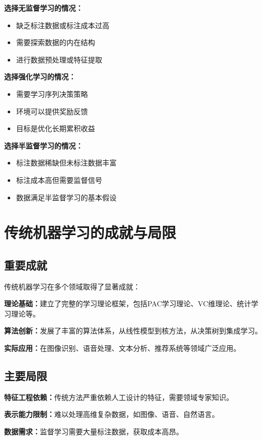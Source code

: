 \textbf{选择无监督学习的情况：}
\begin{itemize}
\item 缺乏标注数据或标注成本过高
\item 需要探索数据的内在结构
\item 进行数据预处理或特征提取
\end{itemize}

\textbf{选择强化学习的情况：}
\begin{itemize}
\item 需要学习序列决策策略
\item 环境可以提供奖励反馈
\item 目标是优化长期累积收益
\end{itemize}

\textbf{选择半监督学习的情况：}
\begin{itemize}
\item 标注数据稀缺但未标注数据丰富
\item 标注成本高但需要监督信号
\item 数据满足半监督学习的基本假设
\end{itemize}

\section{传统机器学习的成就与局限}

\subsection{重要成就}

传统机器学习在多个领域取得了显著成就：

\textbf{理论基础：}建立了完整的学习理论框架，包括PAC学习理论、VC维理论、统计学习理论等。

\textbf{算法创新：}发展了丰富的算法体系，从线性模型到核方法，从决策树到集成学习。

\textbf{实际应用：}在图像识别、语音处理、文本分析、推荐系统等领域广泛应用。

\subsection{主要局限}

\textbf{特征工程依赖：}传统方法严重依赖人工设计的特征，需要领域专家知识。

\textbf{表示能力限制：}难以处理高维复杂数据，如图像、语音、自然语言。

\textbf{数据需求：}监督学习需要大量标注数据，获取成本高昂。

